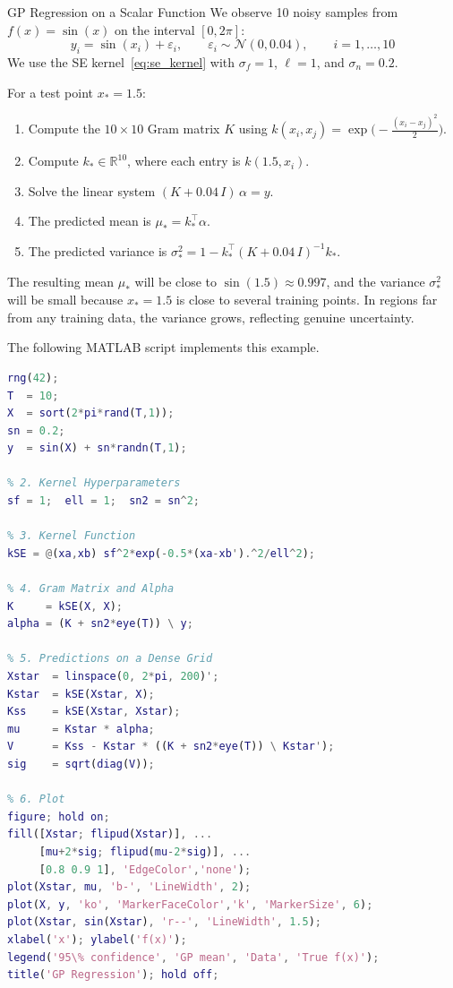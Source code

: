 \begin{examplebox}{GP Regression on a Scalar Function}
	We observe 10 noisy samples from $f(x) = \sin(x)$ on the interval $[0, 2\pi]$:
	\[
	y_i = \sin(x_i) + \varepsilon_i, \qquad \varepsilon_i \sim \mathcal{N}(0, 0.04), \qquad i = 1, \ldots, 10
	\]
	We use the SE kernel~\eqref{eq:se_kernel} with $\sigma_f = 1$, $\ell = 1$, and $\sigma_n = 0.2$.

	\solution

	For a test point $x_* = 1.5$:
	\begin{enumerate}
		\item Compute the $10 \times 10$ Gram matrix $K$ using $k(x_i, x_j) = \exp\bigl(-\frac{(x_i - x_j)^2}{2}\bigr)$.
		\item Compute $k_* \in \mathbb{R}^{10}$, where each entry is $k(1.5, x_i)$.
		\item Solve the linear system $(K + 0.04\,I)\,\alpha = y$.
		\item The predicted mean is $\mu_* = k_*^\top \alpha$.
		\item The predicted variance is $\sigma_*^2 = 1 - k_*^\top (K + 0.04\,I)^{-1}k_*$.
	\end{enumerate}

	The resulting mean $\mu_*$ will be close to $\sin(1.5) \approx 0.997$, and the variance $\sigma_*^2$ will be small because $x_* = 1.5$ is close to several training points. In regions far from any training data, the variance grows, reflecting genuine uncertainty.

The following MATLAB script implements this example.

\begin{lstlisting}[language=Matlab, caption={GP regression for $f(x)=\sin(x)$ from noisy data.}]
% 1. Training Data
rng(42);
T  = 10;
X  = sort(2*pi*rand(T,1));
sn = 0.2;
y  = sin(X) + sn*randn(T,1);

% 2. Kernel Hyperparameters
sf = 1;  ell = 1;  sn2 = sn^2;

% 3. Kernel Function
kSE = @(xa,xb) sf^2*exp(-0.5*(xa-xb').^2/ell^2);

% 4. Gram Matrix and Alpha
K     = kSE(X, X);
alpha = (K + sn2*eye(T)) \ y;

% 5. Predictions on a Dense Grid
Xstar  = linspace(0, 2*pi, 200)';
Kstar  = kSE(Xstar, X);
Kss    = kSE(Xstar, Xstar);
mu     = Kstar * alpha;
V      = Kss - Kstar * ((K + sn2*eye(T)) \ Kstar');
sig    = sqrt(diag(V));

% 6. Plot
figure; hold on;
fill([Xstar; flipud(Xstar)], ...
     [mu+2*sig; flipud(mu-2*sig)], ...
     [0.8 0.9 1], 'EdgeColor','none');
plot(Xstar, mu, 'b-', 'LineWidth', 2);
plot(X, y, 'ko', 'MarkerFaceColor','k', 'MarkerSize', 6);
plot(Xstar, sin(Xstar), 'r--', 'LineWidth', 1.5);
xlabel('x'); ylabel('f(x)');
legend('95\% confidence', 'GP mean', 'Data', 'True f(x)');
title('GP Regression'); hold off;
\end{lstlisting}
\end{examplebox}


